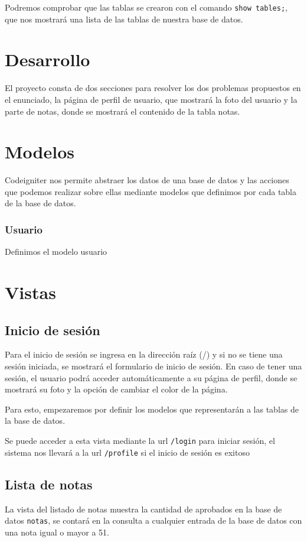 \documentclass[letter]{article}
\begin{document}
Podremos comprobar que las tablas se crearon con el comando \texttt{show tables;}, que
nos mostrará una lista de las tablas de nuestra base de datos.

\section{Desarrollo}
\label{sec:org5a5ee58}
El proyecto consta de dos secciones para resolver los dos problemas propuestos
en el enunciado, la página de perfil de usuario, que mostrará la foto del
usuario y la parte de notas, donde se mostrará el contenido de la tabla notas.

\section{Modelos}
\label{sec:org13103e1}
Codeigniter nos permite abstraer los datos de una base de datos y las acciones
que podemos realizar sobre ellas mediante modelos que definimos por cada tabla
de la base de datos.

\subsubsection{Usuario}
\label{sec:org61c9fef}
Definimos el modelo usuario

\section{Vistas}
\label{sec:org9104397}
\subsection{Inicio de sesión}
\label{sec:org2a13731}
Para el inicio de sesión se ingresa en la dirección raíz (/) y si no se tiene
una sesión iniciada, se mostrará el formulario de inicio de sesión. En caso de
tener una sesión, el usuario podrá acceder automáticamente a su página de
perfil, donde se mostrará su foto y la opción de cambiar el color de la página.

Para esto, empezaremos por definir los modelos que representarán a las tablas de
la base de datos.

Se puede acceder a esta vista mediante la url \texttt{/login} para iniciar sesión, el
sistema nos llevará a la url \texttt{/profile} si el inicio de sesión es exitoso

\subsection{Lista de notas}
\label{sec:org46a9e3d}
La vista del listado de notas muestra la cantidad de aprobados en la base de
datos \texttt{notas}, se contará en la consulta a cualquier entrada de la base de datos
con una nota igual o mayor a 51.
\end{document}
